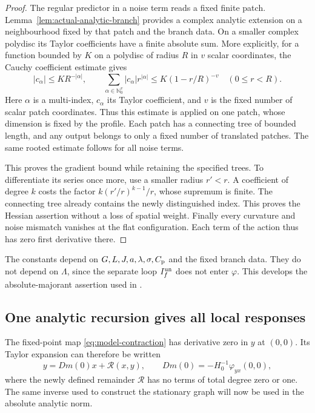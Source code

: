 \documentclass[11pt,reqno]{amsart}
\numberwithin{equation}{section}
\theoremstyle{definition}
\theoremstyle{remark}
\begin{document}
\begin{proof}
The regular predictor in a noise term reads a
fixed finite patch. Lemma~\ref{lem:actual-analytic-branch}
provides a complex analytic extension on a
neighbourhood fixed by that patch and the branch data.
On a smaller complex polydisc its Taylor coefficients
have a finite absolute sum.
More explicitly, for a function bounded by \(K\)
on a polydisc of radius \(R\) in \(v\) scalar
coordinates, the Cauchy coefficient estimate gives
\[
       |c_\alpha|\le KR^{-|\alpha|},\qquad
       \sum_{\alpha\in\mathbb N_0^v}
          |c_\alpha|r^{|\alpha|}
                       \le K(1-r/R)^{-v}\quad(0\le r<R).
\]
Here \(\alpha\) is a multi-index, \(c_\alpha\)
its Taylor coefficient, and \(v\) is the fixed
number of scalar patch coordinates.
Thus this estimate is applied on one patch,
whose dimension is fixed by the profile.
Each patch has a connecting tree of bounded length,
and any output belongs to only a fixed number of
translated patches. The same rooted estimate follows
for all noise terms.

This proves the gradient bound while retaining the
specified trees. To differentiate its series once
more, use a smaller radius \(r'<r\). A coefficient
of degree \(k\) costs the factor
\(k(r'/r)^{k-1}/r\), whose supremum is finite.
The connecting tree already contains the newly
distinguished index. This proves the Hessian
assertion without a loss of spatial weight.
Finally every curvature and noise mismatch vanishes
at the flat configuration. Each term of the action
thus has zero first derivative there.
\end{proof}

The constants depend on
\(G,L,J,a,\lambda,\sigma,C_{\rm p}\) and the fixed
branch data. They do not depend on \(\Lambda\), since
the separate loop \(I_f^{\rm un}\) does not enter \(\varphi\).
This develops the absolute-majorant assertion used
in \cite[Lemma~14.13, p.~67, and Section~16.3,
pp.~80--81]{Main}.

\subsection{One analytic recursion gives all local responses}

The fixed-point map \eqref{eq:model-contraction}
has derivative zero in \(y\) at \((0,0)\).
Its Taylor expansion can therefore be written
\begin{equation}
       y=Dm(0)x+\mathcal R(x,y),\qquad
       Dm(0)=-H_0^{-1}\varphi_{yx}(0,0),
 \label{eq:local-series-equation}
\end{equation}
where the newly defined remainder \(\mathcal R\)
has no terms of total degree zero or one.
The same inverse used to construct the stationary
graph will now be used in the absolute analytic norm.
\end{document}
